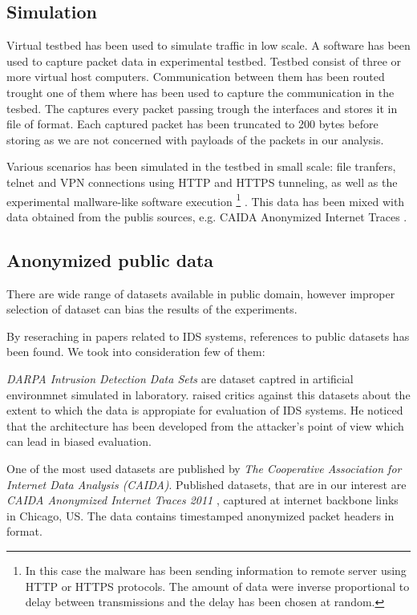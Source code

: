 \subsection{Simulation}
Virtual testbed has been used to simulate traffic in low scale.
A  \cite{jacobson2009tcpdump} software has been used to 
capture packet data in experimental testbed.
Testbed consist of three or more virtual host computers. Communication between
them has been routed trought one of them where  has been used
to capture the communication in the tesbed. The  captures every
packet passing trough the interfaces and stores it in file of  format.
 Each captured
packet has been truncated to 200 bytes before storing as we are not concerned with
payloads of the packets in our analysis.

Various scenarios has been simulated in the testbed  in small scale: 
file tranfers, telnet and VPN  connections
using HTTP and HTTPS tunneling, as well as the experimental mallware-like 
software execution%
\footnote{
    In this case the malware has been sending information to remote server
    using HTTP or HTTPS protocols. The amount of data were
    inverse proportional to delay between transmissions and the delay 
    has been chosen at random.
}%
. This data has been mixed with data obtained from the publis sources, 
e.g. CAIDA Anonymized Internet Traces \cite{caida2011trace}.

\subsection{Anonymized public data}
There are wide range of datasets available in public domain, however improper 
selection of dataset can bias the results of the experiments. 

By reseraching in papers related to IDS systems, references to public datasets has been found.
We took into consideration few of them:

\emph{DARPA Intrusion Detection Data Sets} \cite{darpa1999ids} are dataset captred in artificial
environmnet simulated in laboratory.   raised critics against this datasets about
the extent to which the data is appropiate for evaluation of IDS systems.
He noticed that the architecture has been developed from the attacker's point of view which
can lead in biased evaluation.

One of the most used datasets are published by \emph{The Cooperative Association for Internet 
Data Analysis (CAIDA)}. Published datasets, that are in our interest are 
\emph{CAIDA Anonymized Internet Traces 2011} \cite{caida2011trace},
captured at internet backbone links in Chicago, US.
The data contains timestamped anonymized packet headers in  format.

